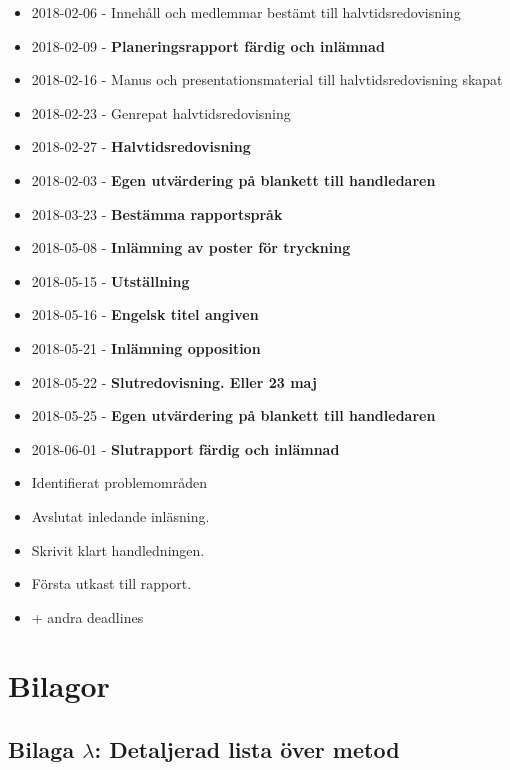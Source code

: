 \documentclass[12pt,a4paper]{article}
\begin{document}
\begin{itemize}
    \item 2018-02-06 - Innehåll och medlemmar bestämt till halvtidsredovisning
    \item 2018-02-09 - \textbf{Planeringsrapport färdig och inlämnad}
    \item 2018-02-16 - Manus och presentationsmaterial till halvtidsredovisning skapat
    \item 2018-02-23 - Genrepat halvtidsredovisning
    \item 2018-02-27 - \textbf{Halvtidsredovisning}
    \item 2018-02-03 - \textbf{Egen utvärdering på blankett till handledaren}
    \item 2018-03-23 - \textbf{Bestämma rapportspråk}
    \item 2018-05-08 - \textbf{Inlämning av poster för tryckning}
    \item 2018-05-15 - \textbf{Utställning}
    \item 2018-05-16 - \textbf{Engelsk titel angiven}
    \item 2018-05-21 - \textbf{Inlämning opposition}
    \item 2018-05-22 - \textbf{Slutredovisning. Eller 23 maj}
    \item 2018-05-25 - \textbf{Egen utvärdering på blankett till handledaren}
    \item 2018-06-01 - \textbf{Slutrapport färdig och inlämnad}
    \item Identifierat problemområden
    \item Avslutat inledande inläsning.
    \item Skrivit klart handledningen.
    \item Första utkast till rapport.
    \item + andra deadlines
\end{itemize}


\newpage
{}

 


\newpage
\section*{Bilagor}
\label{sec:bilaga}

\subsection*{Bilaga $\lambda$: Detaljerad lista över metod}
\end{document}

